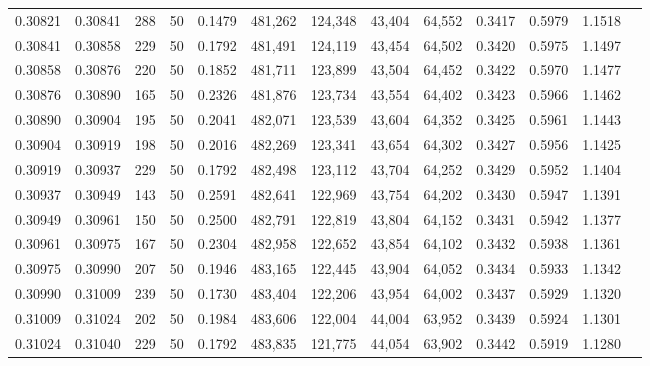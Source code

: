 \begin{tabular}{rrrrrrrrrrrrr}
0.30821 & 0.30841 &   288 &  50 &                                     0.1479 & 481,262 & 124,348 &  43,404 &  64,552 & 0.3417 & 0.5979 & 1.1518 \\
0.30841 & 0.30858 &   229 &  50 &                                     0.1792 & 481,491 & 124,119 &  43,454 &  64,502 & 0.3420 & 0.5975 & 1.1497 \\
0.30858 & 0.30876 &   220 &  50 &                                     0.1852 & 481,711 & 123,899 &  43,504 &  64,452 & 0.3422 & 0.5970 & 1.1477 \\
0.30876 & 0.30890 &   165 &  50 &                                     0.2326 & 481,876 & 123,734 &  43,554 &  64,402 & 0.3423 & 0.5966 & 1.1462 \\
0.30890 & 0.30904 &   195 &  50 &                                     0.2041 & 482,071 & 123,539 &  43,604 &  64,352 & 0.3425 & 0.5961 & 1.1443 \\
0.30904 & 0.30919 &   198 &  50 &                                     0.2016 & 482,269 & 123,341 &  43,654 &  64,302 & 0.3427 & 0.5956 & 1.1425 \\
0.30919 & 0.30937 &   229 &  50 &                                     0.1792 & 482,498 & 123,112 &  43,704 &  64,252 & 0.3429 & 0.5952 & 1.1404 \\
0.30937 & 0.30949 &   143 &  50 &                                     0.2591 & 482,641 & 122,969 &  43,754 &  64,202 & 0.3430 & 0.5947 & 1.1391 \\
0.30949 & 0.30961 &   150 &  50 &                                     0.2500 & 482,791 & 122,819 &  43,804 &  64,152 & 0.3431 & 0.5942 & 1.1377 \\
0.30961 & 0.30975 &   167 &  50 &                                     0.2304 & 482,958 & 122,652 &  43,854 &  64,102 & 0.3432 & 0.5938 & 1.1361 \\
0.30975 & 0.30990 &   207 &  50 &                                     0.1946 & 483,165 & 122,445 &  43,904 &  64,052 & 0.3434 & 0.5933 & 1.1342 \\
0.30990 & 0.31009 &   239 &  50 &                                     0.1730 & 483,404 & 122,206 &  43,954 &  64,002 & 0.3437 & 0.5929 & 1.1320 \\
0.31009 & 0.31024 &   202 &  50 &                                     0.1984 & 483,606 & 122,004 &  44,004 &  63,952 & 0.3439 & 0.5924 & 1.1301 \\
0.31024 & 0.31040 &   229 &  50 &                                     0.1792 & 483,835 & 121,775 &  44,054 &  63,902 & 0.3442 & 0.5919 & 1.1280 \\

\end{tabular}
